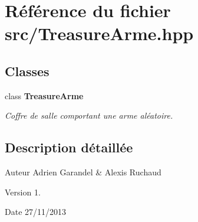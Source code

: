 \section{Référence du fichier src/\-Treasure\-Arme.hpp}
\label{_treasure_arme_8hpp}
\subsection*{Classes}
\begin{DoxyCompactItemize}
\item 
class {\bf Treasure\-Arme}
\begin{DoxyCompactList}\small\item\em Coffre de salle comportant une arme aléatoire. \end{DoxyCompactList}\end{DoxyCompactItemize}


\subsection{Description détaillée}
\begin{DoxyAuthor}{Auteur}
Adrien Garandel \& Alexis Ruchaud 
\end{DoxyAuthor}
\begin{DoxyVersion}{Version}
1. 
\end{DoxyVersion}
\begin{DoxyDate}{Date}
27/11/2013 
\end{DoxyDate}
